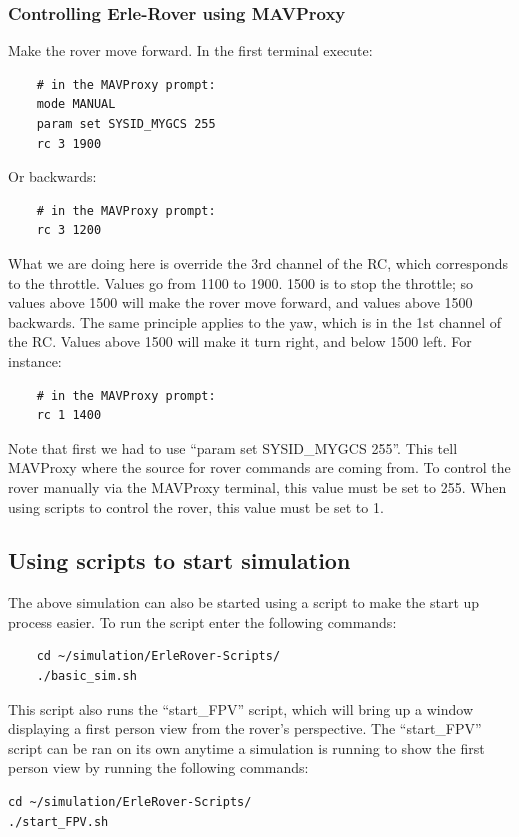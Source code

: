 \documentclass{report}
\begin{document}
\subsubsection{Controlling Erle-Rover using MAVProxy}
Make the rover move forward. In the first terminal execute:
\begin{lstlisting}
	# in the MAVProxy prompt:
	mode MANUAL
	param set SYSID_MYGCS 255
	rc 3 1900
\end{lstlisting}
Or backwards:
\begin{lstlisting}
	# in the MAVProxy prompt:
	rc 3 1200
\end{lstlisting}
What we are doing here is override the 3rd channel of the RC, which corresponds to the throttle. Values go from 1100 to 1900. 1500 is to stop the throttle; so values above 1500 will make the rover move forward, and values above 1500 backwards. The same principle applies to the yaw, which is in the 1st channel of the RC. Values above 1500 will make it turn right, and below 1500 left. For instance:
\begin{lstlisting}
	# in the MAVProxy prompt:
	rc 1 1400
\end{lstlisting}

Note that first we had to use ``param set SYSID\_MYGCS 255''. This tell MAVProxy where the source for rover commands are coming from. To control the rover manually via the MAVProxy terminal, this value must be set to 255. When using scripts to control the rover, this value must be set to 1.

\subsection{Using scripts to start simulation}
The above simulation can also be started using a script to make the start up process easier. To run the script enter the following commands:

\begin{lstlisting}
	cd ~/simulation/ErleRover-Scripts/
	./basic_sim.sh 
\end{lstlisting}
\label{startFPV}
This script also runs the ``start\_FPV'' script, which will bring up a window displaying a first person view from the rover's perspective. The ``start\_FPV'' script can be ran on its own anytime a simulation is running to show the first person view by running the following commands:
\begin{lstlisting}
cd ~/simulation/ErleRover-Scripts/
./start_FPV.sh 
\end{lstlisting}
\end{document}
